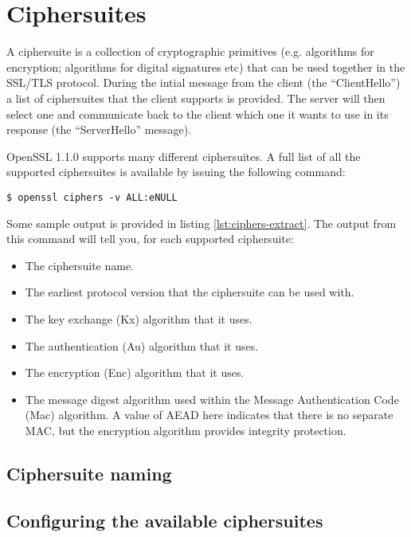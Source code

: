 \chapter{Ciphersuites}

A ciphersuite is a collection of cryptographic primitives (e.g. algorithms for
encryption; algorithms for digital signatures etc) that can be used
together in the SSL/TLS protocol. During the intial message from the client
(the ``ClientHello'') a list of ciphersuites that the client supports is
provided. The server will then select one and communicate back to the client
which one it wants to use in its response (the ``ServerHello'' message).

OpenSSL 1.1.0 supports many different ciphersuites. A full list of all the
supported ciphersuites is available by issuing the following command:

\begin{verbatim}
$ openssl ciphers -v ALL:eNULL
\end{verbatim}

Some sample output is provided in listing \ref{lst:ciphers-extract}. The output
from this command will tell you, for each supported ciphersuite:

\begin{itemize}
\item The ciphersuite name.
\item The earliest protocol version that the ciphersuite can be used with.
\item The key exchange (Kx) algorithm that it uses.
\item The authentication (Au) algorithm that it uses.
\item The encryption (Enc) algorithm that it uses.
\item The message digest algorithm used within the Message Authentication Code
(Mac) algorithm. A value of AEAD here indicates that there is no separate MAC,
but the encryption algorithm provides integrity protection.
\end{itemize}

\section{Ciphersuite naming}


\section{Configuring the available ciphersuites}


